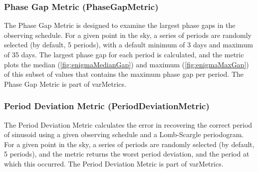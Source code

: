 \subsubsection{Phase Gap Metric (PhaseGapMetric)}

The Phase Gap Metric is designed to examine the largest phase gaps in the observing schedule. For a given point in the sky, a series of periods are randomly selected (by default, 5 periods), with a default minimum of 3 days and maximum of 35 days. The largest phase gap for each period is calculated, and the metric plots the median (\autoref{fig:enigmaMedianGap}) and maximum (\autoref{fig:enigmaMaxGap}) of this subset of values that contains the maximum phase gap per period. The Phase Gap Metric is part of varMetrics.

\subsubsection{Period Deviation Metric (PeriodDeviationMetric)}

The Period Deviation Metric calculates the error in recovering the correct period of sinusoid using a given observing schedule and a Lomb-Scargle periodogram. For a given point in the sky, a series of periods are randomly selected (by default, 5 periods), and the metric returns the worst period deviation, and the period at which this occurred. The Period Deviation Metric is part of varMetrics.























